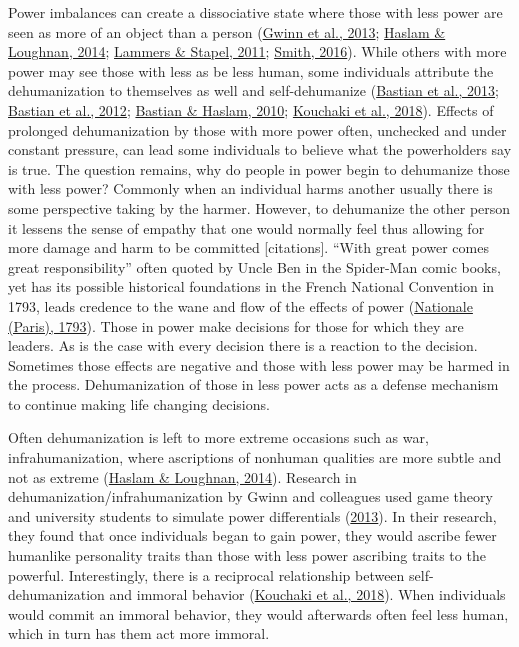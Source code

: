 \documentclass[
  donotrepeattitle,doc, 12pt, a4paper,floatsintext]{apa7}
\begin{document}
Power imbalances can create a dissociative state where those with less power are seen as more of an object than a person (\protect\hyperlink{ref-gwinn2013}{Gwinn et al., 2013}; \protect\hyperlink{ref-haslam2014}{Haslam \& Loughnan, 2014}; \protect\hyperlink{ref-lammers2011}{Lammers \& Stapel, 2011}; \protect\hyperlink{ref-smith2016}{Smith, 2016}). While others with more power may see those with less as be less human, some individuals attribute the dehumanization to themselves as well and self-dehumanize (\protect\hyperlink{ref-bastian2013}{Bastian et al., 2013}; \protect\hyperlink{ref-bastian2012}{Bastian et al., 2012}; \protect\hyperlink{ref-bastian2010}{Bastian \& Haslam, 2010}; \protect\hyperlink{ref-kouchaki2018}{Kouchaki et al., 2018}). Effects of prolonged dehumanization by those with more power often, unchecked and under constant pressure, can lead some individuals to believe what the powerholders say is true. The question remains, why do people in power begin to dehumanize those with less power? Commonly when an individual harms another usually there is some perspective taking by the harmer. However, to dehumanize the other person it lessens the sense of empathy that one would normally feel thus allowing for more damage and harm to be committed {[}citations{]}. ``With great power comes great responsibility'' often quoted by Uncle Ben in the Spider-Man comic books, yet has its possible historical foundations in the French National Convention in 1793, leads credence to the wane and flow of the effects of power (\protect\hyperlink{ref-nationaleparis1793}{Nationale (Paris), 1793}). Those in power make decisions for those for which they are leaders. As is the case with every decision there is a reaction to the decision. Sometimes those effects are negative and those with less power may be harmed in the process. Dehumanization of those in less power acts as a defense mechanism to continue making life changing decisions.

Often dehumanization is left to more extreme occasions such as war, infrahumanization, where ascriptions of nonhuman qualities are more subtle and not as extreme (\protect\hyperlink{ref-haslam2014}{Haslam \& Loughnan, 2014}). Research in dehumanization/infrahumanization by Gwinn and colleagues used game theory and university students to simulate power differentials (\protect\hyperlink{ref-gwinn2013}{2013}). In their research, they found that once individuals began to gain power, they would ascribe fewer humanlike personality traits than those with less power ascribing traits to the powerful. Interestingly, there is a reciprocal relationship between self-dehumanization and immoral behavior (\protect\hyperlink{ref-kouchaki2018}{Kouchaki et al., 2018}). When individuals would commit an immoral behavior, they would afterwards often feel less human, which in turn has them act more immoral.
\end{document}
